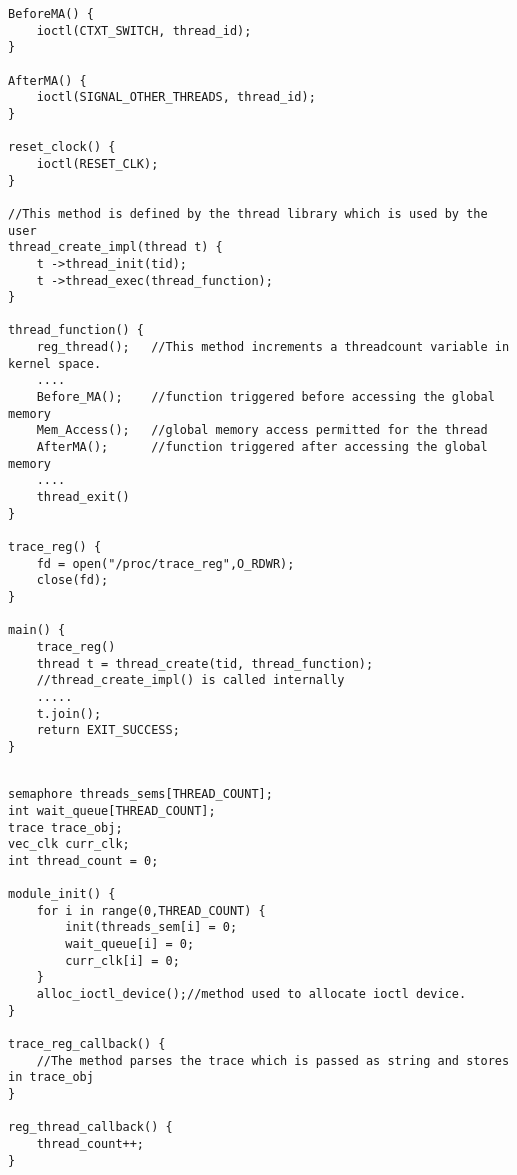 \begin{lstlisting}[title=User Space Implementation, style=customc]
BeforeMA() {	
	ioctl(CTXT_SWITCH, thread_id);	
}

AfterMA() {	
	ioctl(SIGNAL_OTHER_THREADS, thread_id);
}

reset_clock() {
	ioctl(RESET_CLK);
}

//This method is defined by the thread library which is used by the user
thread_create_impl(thread t) {
	t ->thread_init(tid);
	t ->thread_exec(thread_function);
}

thread_function() {
	reg_thread();	//This method increments a threadcount variable in kernel space.
	....	
	Before_MA(); 	//function triggered before accessing the global memory
	Mem_Access();   //global memory access permitted for the thread
	AfterMA();		//function triggered after accessing the global memory		
	....
	thread_exit()
}

trace_reg() {	
	fd = open("/proc/trace_reg",O_RDWR);
	close(fd);	
}

main() {	
	trace_reg()
	thread t = thread_create(tid, thread_function); 
	//thread_create_impl() is called internally
	.....
	t.join();	
	return EXIT_SUCCESS;
}


\end{lstlisting}
\begin{lstlisting}[title=Kernel Space - General module definitions, style=customc]
semaphore threads_sems[THREAD_COUNT];
int wait_queue[THREAD_COUNT];
trace trace_obj;
vec_clk curr_clk;
int thread_count = 0;

module_init() {
	for i in range(0,THREAD_COUNT) {
		init(threads_sem[i] = 0;
		wait_queue[i] = 0;
		curr_clk[i] = 0;
	}
	alloc_ioctl_device();//method used to allocate ioctl device.
}

trace_reg_callback() {
	//The method parses the trace which is passed as string and stores in trace_obj
}

reg_thread_callback() {
	thread_count++;
}

\end{lstlisting}
\newpage
